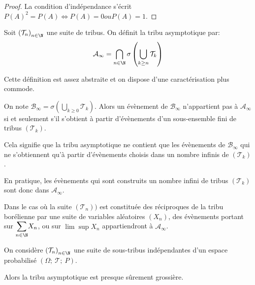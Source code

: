 \begin{proof}
La condition d'indépendance s'écrit $P(A)^2=P(A) \iff P(A)=0 ou P(A)=1$.
\end{proof}

\begin{de}
Soit $\left(\mathcal{T}_n\right)_{n \in \N}$ une suite de tribus. On définit la tribu asymptotique par:
\[
\mathcal{A}_{\infty} 
=
\bigcap \limits_{n \in \N} \sigma\left(\bigcup \limits_{k \geq n} \mathcal{T}_k \right)
\]
\end{de}


Cette définition est assez abstraite et on dispose d'une caractérisation plus commode.

\begin{prop}[Caractérisation]
On note $\mathcal{B}_{\infty} = \sigma\left(\bigcup \limits_{k \geq 0} \mathcal{T}_k \right)$. Alors un évènement de $\mathcal{B}_{\infty}$ n'appartient pas à $\mathcal{A}_{\infty}$ si et seulement s'il s'obtient à partir d'évènements d'un sous-ensemble fini de tribus $(\mathcal{T}_k)$.
\end{prop}

\begin{listremarques}
\item
Cela signifie que la tribu asymptotique ne contient que les évènements de $\mathcal{B}_{\infty}$ qui ne s'obtiennent qu'à partir d'évènements choisis dans un nombre infinis de $(\mathcal{T}_k)$.
\item
En pratique, les évènements qui sont construits un nombre infini de tribus $(\mathcal{T}_k)$ sont donc dans $\mathcal{A}_{\infty}$.
\item
Dans le cas où la suite $\left (\mathcal{T}_n\right ))$ est constituée des réciproques de la tribu borélienne par une suite de variables aléatoires $(X_n)$, des évènements portant sur $\displaystyle{\sum \limits_{n \in \N}} X_n$, ou sur $\lim \sup X_n$ appartiendront à $\mathcal{A}_{\infty}$.
\end{listremarques}


\begin{theo}
\label{tout_ou_rien}
On considère $\left(\mathcal{T}_n\right)_{n \in \N}$ une suite de sous-tribus indépendantes d'un espace probabilisé $(\Omega;~\mathcal{T};~P)$.

Alors la tribu asymptotique est presque sûrement grossière.
\end{theo}
 

